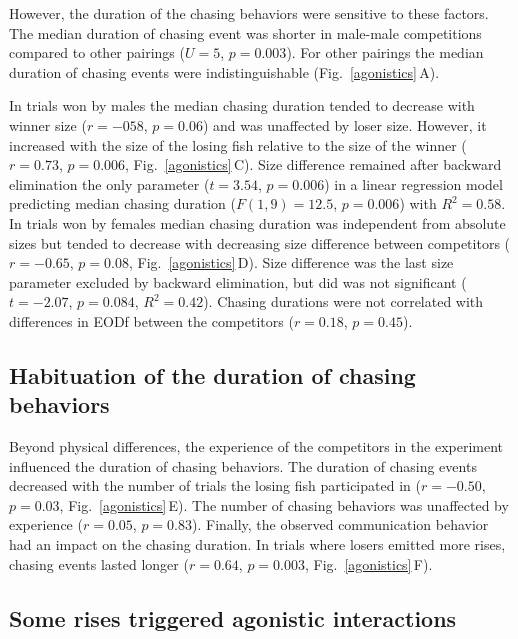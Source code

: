 \documentclass[vruler,JEB]{COB}%
\newcommand{\panel}[1]{\textsf{#1}}
\newcommand{\subfref}[2]{\textup{\ref{#1}}\,\panel{#2}}
\newcommand{\Fig}{Fig.}
\newcommand{\Subfigref}[2]{\Fig~\subfref{#1}{#2}}
\newcommand{\Figb}{Fig.}
\newcommand{\Subfigrefb}[2]{\Figb~\subfref{#1}{#2}}
\begin{document}
However, the duration of the chasing behaviors were sensitive to these factors. The median duration of chasing event was shorter in male-male competitions compared to other pairings ($U=5$, $p=0.003$). For other pairings the median duration of chasing events were indistinguishable (\Subfigref{agonistics}{A}). 

In trials won by males the median chasing duration tended to decrease with winner size ($r=-058$, $p=0.06$) and was unaffected by loser size. However, it increased with the size of the losing fish relative to the size of the winner ($r=0.73$, $p=0.006$, \Subfigrefb{agonistics}{C}). Size difference remained after backward elimination the only parameter ($t=3.54$, $p=0.006$) in a linear regression model predicting median chasing duration ($F(1,9)=12.5$, $p=0.006$) with $R^2 = 0.58$. In trials won by females median chasing duration was independent from absolute sizes but tended to decrease with decreasing size difference between competitors ($r=-0.65$, $p=0.08$, \Subfigrefb{agonistics}{D}). Size difference was the last size parameter excluded by backward elimination, but did was not significant ($t=-2.07$, $p=0.084$, $R^2=0.42$). Chasing durations were not correlated with differences in EODf between the competitors ($r=0.18$, $p=0.45$). 

\subsection{Habituation of the duration of chasing behaviors}

Beyond physical differences, the experience of the competitors in the experiment influenced the duration of chasing behaviors. The duration of chasing events decreased with the number of trials the losing fish participated in ($r=-0.50$, $p=0.03$, \Subfigrefb{agonistics}{E}). The number of chasing behaviors was unaffected by experience ($r=0.05$, $p=0.83$). Finally, the observed communication behavior had an impact on the chasing duration. In trials where losers emitted more rises, chasing events lasted longer ($r=0.64$, $p=0.003$, \Subfigrefb{agonistics}{F}).

\subsection{Some rises triggered agonistic interactions}
\end{document}
